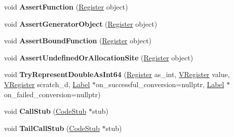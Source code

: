 \begin{DoxyCompactItemize}
void {\bfseries Assert\+Function} (\mbox{\hyperlink{classv8_1_1internal_1_1Register}{Register}} object)
\item 
\mbox{\label{classv8_1_1internal_1_1MacroAssembler_aa71ed557199e69728a422efb18e8fc65}} 
void {\bfseries Assert\+Generator\+Object} (\mbox{\hyperlink{classv8_1_1internal_1_1Register}{Register}} object)
\item 
\mbox{\label{classv8_1_1internal_1_1MacroAssembler_acbd0894b4e268684a580f99882497aed}} 
void {\bfseries Assert\+Bound\+Function} (\mbox{\hyperlink{classv8_1_1internal_1_1Register}{Register}} object)
\item 
\mbox{\label{classv8_1_1internal_1_1MacroAssembler_ad484d7f3e437093d3d9ab4b82959544b}} 
void {\bfseries Assert\+Undefined\+Or\+Allocation\+Site} (\mbox{\hyperlink{classv8_1_1internal_1_1Register}{Register}} object)
\item 
\mbox{\label{classv8_1_1internal_1_1MacroAssembler_ade0f81e85594961f2c8843b010081cb9}} 
void {\bfseries Try\+Represent\+Double\+As\+Int64} (\mbox{\hyperlink{classv8_1_1internal_1_1Register}{Register}} as\+\_\+int, \mbox{\hyperlink{classv8_1_1internal_1_1VRegister}{V\+Register}} value, \mbox{\hyperlink{classv8_1_1internal_1_1VRegister}{V\+Register}} scratch\+\_\+d, \mbox{\hyperlink{classv8_1_1internal_1_1Label}{Label}} $\ast$on\+\_\+successful\+\_\+conversion=nullptr, \mbox{\hyperlink{classv8_1_1internal_1_1Label}{Label}} $\ast$on\+\_\+failed\+\_\+conversion=nullptr)
\item 
\mbox{\label{classv8_1_1internal_1_1MacroAssembler_a6775ba7dd62249b4bd7b668d6f4c1963}} 
void {\bfseries Call\+Stub} (\mbox{\hyperlink{classv8_1_1internal_1_1CodeStub}{Code\+Stub}} $\ast$stub)
\item 
\mbox{\label{classv8_1_1internal_1_1MacroAssembler_a5255a8669ff98768dee25f5cee80363a}} 
void {\bfseries Tail\+Call\+Stub} (\mbox{\hyperlink{classv8_1_1internal_1_1CodeStub}{Code\+Stub}} $\ast$stub)
\item 
\mbox{\label{classv8_1_1internal_1_1MacroAssembler_a37081c297a4c533e549cc58167f7ccaa}} 

\end{DoxyCompactItemize}

